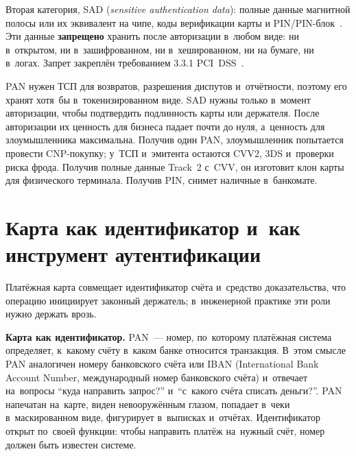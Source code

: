 Вторая категория, SAD (\textit{sensitive authentication data}): полные данные магнитной
полосы или их эквивалент на чипе, коды верификации карты и
PIN/PIN-блок~\cite{pci-faq-1335}. Эти данные \textbf{запрещено} хранить после
авторизации в~любом виде: ни в~открытом, ни в~зашифрованном, ни в~хешированном,
ни на бумаге, ни в~логах. Запрет закреплён требованием 3.3.1
PCI~DSS~\cite{pci-dss-4,pci-faq-1280}.

PAN нужен ТСП для возвратов, разрешения диспутов и~отчётности, поэтому его
хранят хотя~бы в~токенизированном виде. SAD нужны только в~момент
авторизации, чтобы подтвердить подлинность карты или держателя. После
авторизации их ценность для бизнеса падает почти до нуля, а~ценность для
злоумышленника максимальна. Получив один PAN, злоумышленник попытается провести
CNP-покупку; у~ТСП и~эмитента остаются CVV2, 3DS и~проверки риска фрода.
Получив полные данные Track~2 с~CVV, он изготовит клон карты для физического
терминала. Получив PIN, снимет наличные в~банкомате.

\FloatBarrier
{}

\section{Карта как идентификатор и~как инструмент аутентификации}\label{sec:card-data-identity-vs-auth}

Платёжная карта совмещает идентификатор счёта и~средство доказательства, что
операцию инициирует законный держатель; в~инженерной практике эти роли нужно
держать врозь.

\textbf{Карта как идентификатор.} PAN~--- номер, по~которому платёжная система
определяет, к~какому счёту в~каком банке относится транзакция. В~этом смысле
PAN аналогичен номеру банковского счёта или IBAN (International Bank Account
Number, международный номер банковского счёта) и~отвечает на~вопросы
\enquote{куда направить запрос?} и~\enquote{с~какого счёта списать деньги?}.
PAN напечатан на~карте, виден невооружённым глазом, попадает в~чеки
в~маскированном виде, фигурирует в~выписках и~отчётах. Идентификатор открыт
по~своей функции: чтобы направить платёж на~нужный счёт, номер должен быть
известен системе.%


